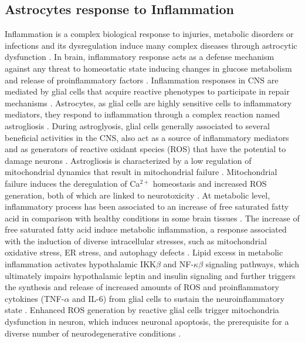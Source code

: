 \subsection*{Astrocytes response to Inflammation}
Inflammation is a complex biological response to injuries, metabolic disorders or infections and its dysregulation induce many complex diseases through astrocytic dysfunction \cite{Masel2010,Yan2013,Jha2016}. In brain, inflammatory response acts as a defense mechanism against any threat to homeostatic state inducing changes in glucose metabolism and release of proinflammatory factors \cite{Allaman2011}. Inflammation responses in CNS are mediated by glial cells that acquire reactive phenotypes to participate in repair mechanisms \cite{Takuma2004,Fitch2008,Jha2016}. Astrocytes, as glial cells are highly sensitive cells to inflammatory mediators, they respond to inflammation through a complex reaction named astrogliosis \cite{Dowell2009a}. During astroglyosis,  glial cells generally associated to several beneficial activities in the CNS, also act as a source of inflammatory mediators and as generators of reactive oxidant species (ROS) that have the potential to damage neurons \cite{Molofsk2012}. Astrogliosis is characterized by a low regulation of mitochondrial dynamics that result in mitochondrial failure \cite{Sidoryk-Wegrzynowicz2013}.  Mitochondrial failure induces the deregulation of Ca$^{2+}$ homeostasis and increased ROS generation, both of which are linked to neurotoxicity \cite{Lange2012}. At metabolic level, inflammatory process has been associated to an increase of free saturated fatty acid in comparison with healthy conditions in some brain tissues \cite{Gupta2012}. The increase of free saturated fatty acid induce metabolic inflammation, a response associated with the induction of diverse intracellular stresses, such as mitochondrial oxidative stress, ER stress, and autophagy defects \cite{Jha2016}. Lipid excess in metabolic inflammation activates hypothalamic IKK$\beta$ and NF-$\kappa\beta$ signaling pathways, which ultimately impairs hypothalamic leptin and insulin signaling and further triggers the synthesis and release of increased amounts of ROS and proinflammatory cytokines (TNF-$\alpha$ and IL-6) from glial cells to sustain the neuroinflammatory state \cite{Purkayastha2015}. Enhanced ROS generation by reactive glial cells trigger mitochondria dysfunction in neuron, which induces neuronal apoptosis, the prerequisite for a diverse number of neurodegenerative conditions \cite{K.2006}.

